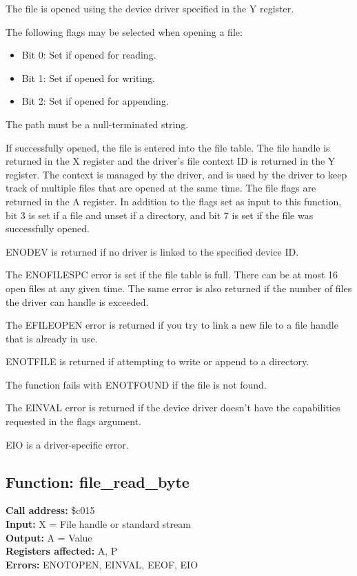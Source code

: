 The file is opened using the device driver specified in the Y register.

The following flags may be selected when opening a file:

\begin{itemize}   
    \item Bit 0: Set if opened for reading.
    \item Bit 1: Set if opened for writing.
    \item Bit 2: Set if opened for appending.
\end{itemize}

The path must be a null-terminated string.

If successfully opened, the file is entered into the file table. The file
handle is returned in the X register and the driver's file context ID is
returned in the Y register. The context is managed by the driver, and is used 
by the driver to keep track of multiple files that are opened at the same time.
The file flags are returned in the A register. In addition to the flags set
as input to this function, bit 3 is set if a file and unset if a directory, and
bit 7 is set if the file was successfully opened.

ENODEV is returned if no driver is linked to the specified device ID.

The ENOFILESPC error is set if the file table is full. There can be at most 16 open files
at any given time. The same error is also returned if the number of files the driver
can handle is exceeded.

The EFILEOPEN error is returned if you try to link a new file to a file handle that is already in use.

ENOTFILE is returned if attempting to write or append to a directory.

The function fails with ENOTFOUND if the file is not found.

The EINVAL error is returned if the device driver doesn't have the capabilities
requested in the flags argument.

EIO is a driver-specific error.


\subsection{Function: file\_read\_byte}

\textbf{Call address:} \$c015\\
\textbf{Input:} X = File handle or standard stream \\
\textbf{Output:} A = Value \\
\textbf{Registers affected:} A, P \\
\textbf{Errors:} ENOTOPEN, EINVAL, EEOF, EIO

